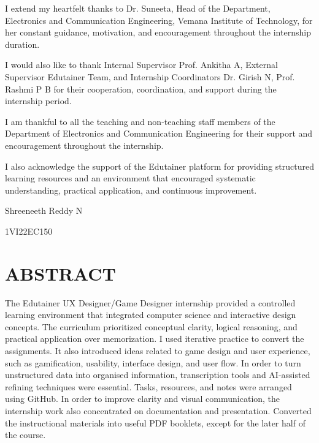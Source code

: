 \documentclass[12pt,a4paper]{report}
\begin{document}
I extend my heartfelt thanks to Dr. Suneeta, Head of the Department, Electronics and Communication Engineering, Vemana Institute of Technology, for her constant guidance, motivation, and encouragement throughout the internship duration.

I would also like to thank Internal Supervisor Prof. Ankitha A, External Supervisor Edutainer Team, and Internship Coordinators Dr. Girish N, Prof. Rashmi P B for their cooperation, coordination, and support during the internship period.

I am thankful to all the teaching and non-teaching staff members of the Department of Electronics and Communication Engineering for their support and encouragement throughout the internship.

I also acknowledge the support of the Edutainer platform for providing structured learning resources and an environment that encouraged systematic understanding, practical application, and continuous improvement.

\vspace{0.5cm}
Shreeneeth Reddy N\par
1VI22EC150\par

\newpage
\chapter*{ABSTRACT}

The Edutainer UX Designer/Game Designer internship provided a controlled learning environment that integrated computer science and interactive design concepts. The curriculum prioritized conceptual clarity, logical reasoning, and practical application over memorization. I used iterative practice to convert the assignments. It also introduced ideas related to game design and user experience, such as gamification, usability, interface design, and user flow. In order to turn unstructured data into organised information, transcription tools and AI-assisted refining techniques were essential. Tasks, resources, and notes were arranged using GitHub. In order to improve clarity and visual communication, the internship work also concentrated on documentation and presentation. Converted the instructional materials into useful PDF booklets, except for the later half of the course.

\newpage
\tableofcontents
{}

\newpage
\listoffigures
{}
\end{document}
